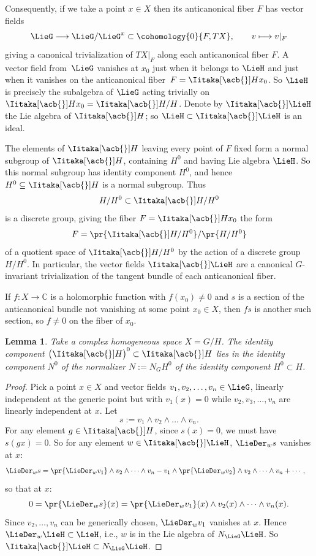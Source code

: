 \documentclass[10pt,a4paper]{amsart}
\providecommand{\C}{}
\numberwithin{equation}{section}
\newtheorem{Lemma}[Theorem]{Lemma}
\renewcommand{\C}{\mathbb{C}}
\newcommand*{\acf}[1]{\Iitaka[\acb{}]{#1}}
\begin{document}
Consequently, if we take a point $x \in X$ then its anticanonical fiber $F$ has vector fields
\[
\LieG \longrightarrow \LieG/\LieG^x \subset \cohomology{0}{F, TX}, \qquad
v \longmapsto v|_F
\]
giving a canonical trivialization of $ TX|_F$ along each anticanonical fiber $F$.
A vector field from~$\LieG$ vanishes at $x_0$ just when it belongs to $\LieH$ and just when it vanishes on the anticanonical
fiber~${F = \acf{H}x_0}$.
So $\LieH$ is precisely the subalgebra of $\LieG$ acting trivially on $\acf{H}x_0 = \acf{H}/H$.
Denote by $\acf\LieH$ the Lie algebra of $\acf{H}$; so $\LieH \subset \acf\LieH$ is an ideal.

The elements of $\acf{H}$ leaving every point of $F$ fixed form a normal subgroup of $\acf{H}$, containing $H^0$ and having Lie algebra $\LieH$.
So this normal subgroup has identity component $H^0$, and hence $H^0 \subseteq \acf{H}$ is a normal subgroup.
Thus
\[
H/H^0 \subset \acf{H}/H^0
\]
is a discrete group, giving the fiber $F = \acf{H}x_0$ the form
\[
F = \pr{\acf{H}/H^0}/\pr{H/H^0}
\]
of a quotient space of $\acf{H}/H^0$ by the action of a discrete group $H/H^0$.
In particular, the vector fields $\acf\LieH$ are a canonical $G$-invariant trivialization of the tangent bundle of each anticanonical fiber.

If $f \colon X \to \C$ is a holomorphic function with $f(x_0) \ne 0$ and $s$ is a section of the anticanonical bundle not vanishing at some point $x_0 \in X$, then $fs$ is another such section, so $f\ne 0$ on the fiber of $x_0$.

\begin{Lemma}
Take a complex homogeneous space $X = G/H$.
The identity component $\big(\acf{H}\big)^0 \subset \acf{H}$ lies in the identity component $N^0$ of the
normalizer $N := N_G H^0$ of the identity component $H^0 \subset H$.
\end{Lemma}

\begin{proof}
Pick a point $x \in X$ and vector fields $v_1, v_2, \dots, v_n \in \LieG$, linearly independent at the generic point
but with $v_1(x) = 0$ while $v_2, v_3, \dots, v_n$ are linearly independent at $x$.
Let
\[
s := v_1 \wedge v_2 \wedge \dots \wedge v_n.
\]
For any element $g \in \acf{H}$, since $s(x) = 0$, we must have $s(gx) = 0$.
So for any element $w \in \acf\LieH$, $\LieDer_w s$ vanishes at $x$:
\begin{align*}
\LieDer_w s
& =
\pr{\LieDer_w v_1} \wedge v_2 \wedge \dots \wedge v_n - v_1 \wedge \pr{\LieDer_w v_2} \wedge v_2 \wedge \dots \wedge v_n + \cdots,
\end{align*}
so that at $x$:
\[
0 = \pr{\LieDer_w s}(x) = \pr{\LieDer_w v_1}(x) \wedge v_2(x) \wedge \dots \wedge v_n(x).
\]
Since $v_2, \dots, v_n$ can be generically chosen, $\LieDer_w v_1$ vanishes at $x$.
Hence $\LieDer_w \LieH \subset \LieH$, i.e., $w$ is in the Lie algebra of $N_{\LieG} \LieH$.
So $\acf\LieH \subset N_{\LieG} \LieH$.
\end{proof}
\end{document}

